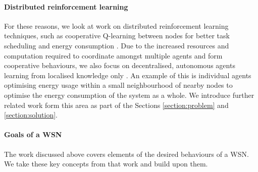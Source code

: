 \paragraph{Distributed reinforcement learning}
For these reasons, we look at work on distributed reinforcement learning techniques, such as cooperative Q-learning between nodes for better task scheduling and energy consumption \citep{doi:10.1155/2014/765182}. Due to the increased resources and computation required to coordinate amongst multiple agents and form cooperative behaviours, we also focus on decentralised, autonomous agents learning from localised knowledge only \citep{10.1007/978-3-642-11814-2_4}.  An example of this is individual agents optimising energy usage within a small neighbourhood of nearby nodes to optimise the energy consumption of the system as a whole. We introduce further related work form this area as part of the Sections \ref{section:problem} and \ref{section:solution}.


\paragraph{Goals of a WSN}
The work discussed above covers elements of the desired behaviours of a WSN. We take these key concepts from that work and build upon them.

